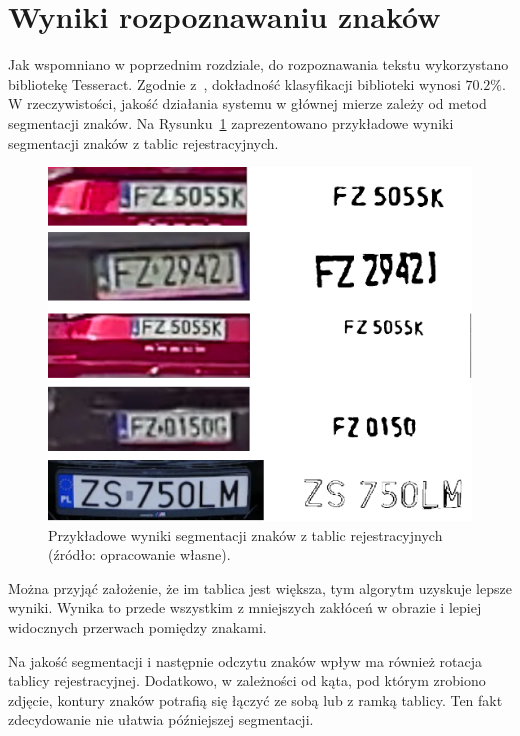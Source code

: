 \section{Wyniki rozpoznawaniu znaków}
Jak wspomniano w poprzednim rozdziale, do rozpoznawania tekstu wykorzystano bibliotekę Tesseract.
Zgodnie z~\cite{sym12050715}, dokładność klasyfikacji biblioteki wynosi $70.2\%$.
W rzeczywistości, jakość działania systemu w głównej mierze zależy od metod segmentacji znaków.
Na Rysunku~\ref{fig:plates} zaprezentowano przykładowe wyniki segmentacji znaków z tablic rejestracyjnych.
\begin{figure}[!ht]
    \centering
    \includegraphics[scale=0.4]{Pictures/plates}
    \caption{Przykładowe wyniki segmentacji znaków z tablic rejestracyjnych (źródło: opracowanie własne).}
    \label{fig:plates}
\end{figure}
\FloatBarrier
Można przyjąć założenie, że im tablica jest większa, tym algorytm uzyskuje lepsze wyniki.
Wynika to przede wszystkim z mniejszych zakłóceń w obrazie i lepiej widocznych przerwach pomiędzy znakami.

Na jakość segmentacji i następnie odczytu znaków wpływ ma również rotacja tablicy rejestracyjnej.
Dodatkowo, w zależności od kąta, pod którym zrobiono zdjęcie, kontury znaków potrafią się łączyć ze sobą lub z ramką tablicy.
Ten fakt zdecydowanie nie ułatwia późniejszej segmentacji.


